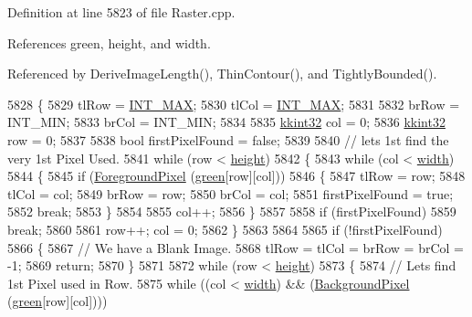 Definition at line 5823 of file Raster.\+cpp.



References green, height, and width.



Referenced by Derive\+Image\+Length(), Thin\+Contour(), and Tightly\+Bounded().


\begin{DoxyCode}
5828 \{
5829   tlRow = \hyperlink{_usf_cas_cor_8h_a9ec306f36d50c7375e74f0d1c55a3a67}{INT\_MAX};
5830   tlCol = \hyperlink{_usf_cas_cor_8h_a9ec306f36d50c7375e74f0d1c55a3a67}{INT\_MAX};
5831 
5832   brRow = INT\_MIN;
5833   brCol = INT\_MIN;
5834 
5835   \hyperlink{namespace_k_k_b_a8fa4952cc84fda1de4bec1fbdd8d5b1b}{kkint32}  col = 0;
5836   \hyperlink{namespace_k_k_b_a8fa4952cc84fda1de4bec1fbdd8d5b1b}{kkint32}  row = 0;
5837 
5838   \textcolor{keywordtype}{bool}  firstPixelFound = \textcolor{keyword}{false};
5839 
5840   \textcolor{comment}{// lets 1st find the very 1st Pixel Used.}
5841   \textcolor{keywordflow}{while}  (row < \hyperlink{class_k_k_b_1_1_raster_af39ff189de4fbb6de98392e187efafb7}{height}) 
5842   \{
5843     \textcolor{keywordflow}{while}  (col < \hyperlink{class_k_k_b_1_1_raster_ae0bcc103e191c3421d7692dc69ceb554}{width})
5844     \{
5845       \textcolor{keywordflow}{if}  (\hyperlink{class_k_k_b_1_1_raster_aa1e1363589e719eb64f0957281b84b6a}{ForegroundPixel} (\hyperlink{class_k_k_b_1_1_raster_a2d2238911145488e226cd2e34fc8448c}{green}[row][col]))
5846       \{
5847         tlRow = row;
5848         tlCol = col;
5849         brRow = row;
5850         brCol = col;
5851         firstPixelFound = \textcolor{keyword}{true};
5852         \textcolor{keywordflow}{break};
5853       \}
5854 
5855       col++;
5856     \}
5857 
5858     \textcolor{keywordflow}{if}  (firstPixelFound)
5859       \textcolor{keywordflow}{break};
5860  
5861     row++; col = 0;
5862   \}
5863 
5864 
5865   \textcolor{keywordflow}{if}  (!firstPixelFound)
5866   \{
5867     \textcolor{comment}{// We have a Blank Image.}
5868     tlRow = tlCol = brRow = brCol = -1;
5869     \textcolor{keywordflow}{return};
5870   \}
5871 
5872   \textcolor{keywordflow}{while}  (row < \hyperlink{class_k_k_b_1_1_raster_af39ff189de4fbb6de98392e187efafb7}{height})
5873   \{
5874     \textcolor{comment}{// Lets find 1st Pixel used in Row.}
5875     \textcolor{keywordflow}{while}  ((col < \hyperlink{class_k_k_b_1_1_raster_ae0bcc103e191c3421d7692dc69ceb554}{width})  &&  (\hyperlink{class_k_k_b_1_1_raster_a0756fb5530274d5e28858d3e1633d595}{BackgroundPixel} (\hyperlink{class_k_k_b_1_1_raster_a2d2238911145488e226cd2e34fc8448c}{green}[row][col])))

\end{DoxyCode}
